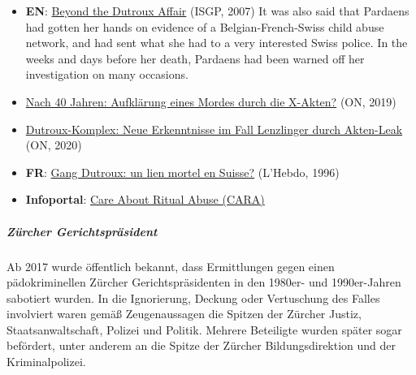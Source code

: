 \begin{itemize}
\tightlist
\item
  \textbf{EN}:
  \href{https://isgp-studies.com/belgian-x-dossiers-of-the-dutroux-affair}{Beyond
  the Dutroux Affair} (ISGP, 2007) It was also said that Pardaens had
  gotten her hands on evidence of a Belgian-French-Swiss child abuse
  network, and had sent what she had to a very interested Swiss police.
  In the weeks and days before her death, Pardaens had been warned off
  her investigation on many occasions.
\item
  \href{https://olivernevermind.wordpress.com/2019/10/02/nach-40-jahren-aufklaerung-eines-mordes-durch-die-x-akten/}{Nach
  40 Jahren: Aufklärung eines Mordes durch die X-Akten?} (ON, 2019)
\item
  \href{https://olivernevermind.wordpress.com/2020/01/07/dutroux-komplex-neue-erkenntnisse-im-fall-lenzlinger-durch-akten-leak/}{Dutroux-Komplex:
  Neue Erkenntnisse im Fall Lenzlinger durch Akten-Leak} (ON, 2020)
\item
  \textbf{FR}:
  \href{https://swprs.files.wordpress.com/2019/10/gang-dutroux-suisse-hebdo-1996.pdf}{Gang
  Dutroux: un lien mortel en Suisse?} (L'Hebdo, 1996)
\item
  \textbf{Infoportal}: \href{http://www.verein-cara.ch/}{Care About
  Ritual Abuse (CARA)}
\end{itemize}

\hypertarget{zuxfcrcher-gerichtspruxe4sident}{%
\subparagraph{\texorpdfstring{\textbf{Zürcher
Gerichtspräsident}}{Zürcher Gerichtspräsident}}\label{zuxfcrcher-gerichtspruxe4sident}}

Ab 2017 wurde öffentlich bekannt, dass Ermittlungen gegen einen
pädokriminellen Zürcher Gerichtspräsidenten in den 1980er- und
1990er-Jahren sabotiert wurden. In die Ignorierung, Deckung oder
Vertuschung des Falles involviert waren gemäß Zeugenaussagen die Spitzen
der Zürcher Justiz, Staatsanwaltschaft, Polizei und Politik. Mehrere
Beteiligte wurden später sogar befördert, unter anderem an die Spitze
der Zürcher Bildungsdirektion und der Kriminalpolizei.

